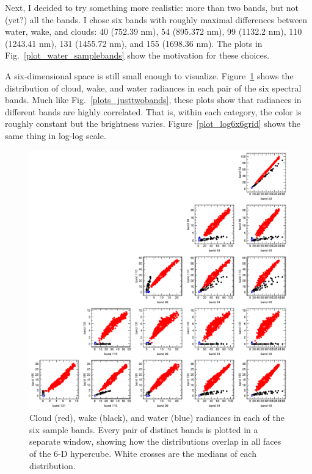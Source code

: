 \documentclass[12pt]{article}
\begin{document}
Next, I decided to try something more realistic: more than two bands,
but not (yet?) all the bands.  I chose six bands with roughly maximal
differences between water, wake, and clouds: 40 (752.39 nm), 54
(895.372 nm), 99 (1132.2 nm), 110 (1243.41 nm), 131 (1455.72 nm), and
155 (1698.36 nm).  The plots in Fig.~\ref{plot_water_samplebands} show
the motivation for these choices.

A six-dimensional space is still small enough to visualize.
Figure~\ref{plot_6x6grid} shows the distribution of cloud, wake, and
water radiances in each pair of the six spectral bands.  Much like
Fig.~\ref{plots_justtwobands}, these plots show that radiances in
different bands are highly correlated.  That is, within each category,
the color is roughly constant but the brightness varies.
Figure~\ref{plot_log6x6grid} shows the same thing in log-log scale.

\begin{figure}[p]
\begin{center}
\includegraphics[width=\linewidth]{plot_6x6grid.png}
\end{center}
\caption{Cloud (red), wake (black), and water (blue) radiances in
  each of the six sample bands.  Every pair of distinct bands is
  plotted in a separate window, showing how the distributions overlap
  in all faces of the 6-D hypercube.  White crosses are the medians
  of each distribution. \label{plot_6x6grid}}
\end{figure}
\end{document}

